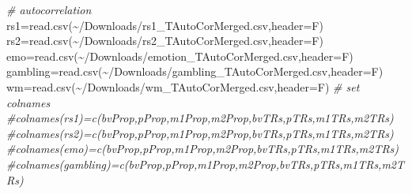 \documentclass[
]{article}
\newenvironment{Shaded}{\begin{snugshade}}{\end{snugshade}}
\newcommand{\AttributeTok}[1]{\textcolor[rgb]{0.77,0.63,0.00}{#1}}
\newcommand{\CommentTok}[1]{\textcolor[rgb]{0.56,0.35,0.01}{\textit{#1}}}
\newcommand{\FunctionTok}[1]{\textcolor[rgb]{0.00,0.00,0.00}{#1}}
\newcommand{\NormalTok}[1]{#1}
\newcommand{\OtherTok}[1]{\textcolor[rgb]{0.56,0.35,0.01}{#1}}
\newcommand{\StringTok}[1]{\textcolor[rgb]{0.31,0.60,0.02}{#1}}
\begin{document}
\begin{Shaded}
\begin{Highlighting}[]
\CommentTok{\# autocorrelation}
\NormalTok{rs1}\OtherTok{=}\FunctionTok{read.csv}\NormalTok{(}\StringTok{\textquotesingle{}\textasciitilde{}/Downloads/rs1\_TAutoCorMerged.csv\textquotesingle{}}\NormalTok{,}\AttributeTok{header=}\NormalTok{F)}
\NormalTok{rs2}\OtherTok{=}\FunctionTok{read.csv}\NormalTok{(}\StringTok{\textquotesingle{}\textasciitilde{}/Downloads/rs2\_TAutoCorMerged.csv\textquotesingle{}}\NormalTok{,}\AttributeTok{header=}\NormalTok{F)}
\NormalTok{emo}\OtherTok{=}\FunctionTok{read.csv}\NormalTok{(}\StringTok{\textquotesingle{}\textasciitilde{}/Downloads/emotion\_TAutoCorMerged.csv\textquotesingle{}}\NormalTok{,}\AttributeTok{header=}\NormalTok{F)}
\NormalTok{gambling}\OtherTok{=}\FunctionTok{read.csv}\NormalTok{(}\StringTok{\textquotesingle{}\textasciitilde{}/Downloads/gambling\_TAutoCorMerged.csv\textquotesingle{}}\NormalTok{,}\AttributeTok{header=}\NormalTok{F)}
\NormalTok{wm}\OtherTok{=}\FunctionTok{read.csv}\NormalTok{(}\StringTok{\textquotesingle{}\textasciitilde{}/Downloads/wm\_TAutoCorMerged.csv\textquotesingle{}}\NormalTok{,}\AttributeTok{header=}\NormalTok{F)}
\CommentTok{\# set colnames}
\CommentTok{\#colnames(rs1)=c(\textquotesingle{}bvProp\textquotesingle{},\textquotesingle{}pProp\textquotesingle{},\textquotesingle{}m1Prop\textquotesingle{},\textquotesingle{}m2Prop\textquotesingle{},\textquotesingle{}bvTRs\textquotesingle{},\textquotesingle{}pTRs\textquotesingle{},\textquotesingle{}m1TRs\textquotesingle{},\textquotesingle{}m2TRs\textquotesingle{})}
\CommentTok{\#colnames(rs2)=c(\textquotesingle{}bvProp\textquotesingle{},\textquotesingle{}pProp\textquotesingle{},\textquotesingle{}m1Prop\textquotesingle{},\textquotesingle{}m2Prop\textquotesingle{},\textquotesingle{}bvTRs\textquotesingle{},\textquotesingle{}pTRs\textquotesingle{},\textquotesingle{}m1TRs\textquotesingle{},\textquotesingle{}m2TRs\textquotesingle{})}
\CommentTok{\#colnames(emo)=c(\textquotesingle{}bvProp\textquotesingle{},\textquotesingle{}pProp\textquotesingle{},\textquotesingle{}m1Prop\textquotesingle{},\textquotesingle{}m2Prop\textquotesingle{},\textquotesingle{}bvTRs\textquotesingle{},\textquotesingle{}pTRs\textquotesingle{},\textquotesingle{}m1TRs\textquotesingle{},\textquotesingle{}m2TRs\textquotesingle{})}
\CommentTok{\#colnames(gambling)=c(\textquotesingle{}bvProp\textquotesingle{},\textquotesingle{}pProp\textquotesingle{},\textquotesingle{}m1Prop\textquotesingle{},\textquotesingle{}m2Prop\textquotesingle{},\textquotesingle{}bvTRs\textquotesingle{},\textquotesingle{}pTRs\textquotesingle{},\textquotesingle{}m1TRs\textquotesingle{},\textquotesingle{}m2TRs\textquotesingle{})}

\end{Highlighting}
\end{Shaded}
\end{document}
